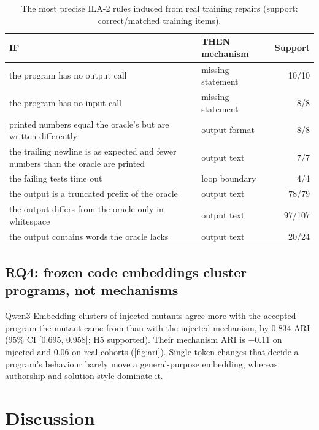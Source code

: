 \documentclass[a4paper,preprint,12pt,authoryear]{elsarticle}
\begin{document}
\begin{table}[t]
\centering
\caption{The most precise ILA-2 rules induced from real training repairs (support: correct/matched training items).}\label{tab:toprules}
\small
\begin{tabular}{p{7.6cm}p{3.0cm}r}
\toprule
IF & THEN mechanism & Support \\
\midrule
the program has no output call & missing statement & 10/10 \\
the program has no input call & missing statement & 8/8 \\
printed numbers equal the oracle's but are written differently & output format & 8/8 \\
the trailing newline is as expected and fewer numbers than the oracle are printed & output text & 7/7 \\
the failing tests time out & loop boundary & 4/4 \\
the output is a truncated prefix of the oracle & output text & 78/79 \\
the output differs from the oracle only in whitespace & output text & 97/107 \\
the output contains words the oracle lacks & output text & 20/24 \\
\bottomrule
\end{tabular}
\end{table}

\subsection{RQ4: frozen code embeddings cluster programs, not mechanisms}
Qwen3-Embedding clusters of injected mutants agree more with the accepted program the mutant came from than with the injected mechanism, by 0.834 ARI (95\% CI [0.695, 0.958]; H5 supported). Their mechanism ARI is $-$0.11 on injected and 0.06 on real cohorts (\cref{fig:ari}). Single-token changes that decide a program's behaviour barely move a general-purpose embedding, whereas authorship and solution style dominate it.

\section{Discussion}\label{sec:discussion}
\end{document}
